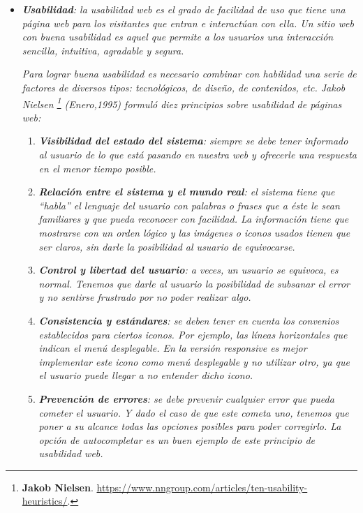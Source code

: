 \documentclass[11pt,oneside]{book}
\begin{document}
\begin{itemize}
\item \textit{\textbf{Usabilidad}: la usabilidad web es el grado de facilidad de uso que tiene una página web para los visitantes que entran e interactúan con ella. Un sitio web con buena usabilidad es aquel que permite a los usuarios una interacción sencilla, intuitiva, agradable y segura.}
    
\textit{Para lograr buena usabilidad es necesario combinar con habilidad una serie de factores de diversos tipos: tecnológicos, de diseño, de contenidos, etc. Jakob Nielsen \footnote{\textbf{Jakob Nielsen}. \url{https://www.nngroup.com/articles/ten-usability-heuristics/}.} (Enero,1995) formuló diez principios sobre usabilidad de páginas web:}

\begin{enumerate}
\item \textit{\textbf{Visibilidad del estado del sistema}: siempre se debe tener informado al usuario de lo que está pasando en nuestra web y ofrecerle una respuesta en el menor tiempo posible.}

\item \textit{\textbf{Relación entre el sistema y el mundo real}: el sistema tiene que ``habla'' el lenguaje del usuario con palabras o frases que a éste le sean familiares y que pueda reconocer con facilidad. La información tiene que mostrarse con un orden lógico y las imágenes o iconos usados tienen que ser claros, sin darle la posibilidad al usuario de equivocarse.}

\item \textit{\textbf{Control y libertad del usuario}: a veces, un usuario se equivoca, es normal. Tenemos que darle al usuario la posibilidad de subsanar el error y no sentirse frustrado por no poder realizar algo.}

\item \textit{\textbf{Consistencia y estándares}: se deben tener en cuenta los convenios establecidos para ciertos iconos. Por ejemplo, las líneas horizontales que indican el menú desplegable. En la versión responsive es mejor implementar este icono como menú desplegable y no utilizar otro, ya que el usuario puede llegar a no entender dicho icono.}

\item \textit{\textbf{Prevención de errores}: se debe prevenir cualquier error que pueda cometer el usuario. Y dado el caso de que este cometa uno, tenemos que poner a su alcance todas las opciones posibles para poder corregirlo. La opción de autocompletar es un buen ejemplo de este principio de usabilidad web.}


\end{enumerate}
\end{itemize}
\end{document}
